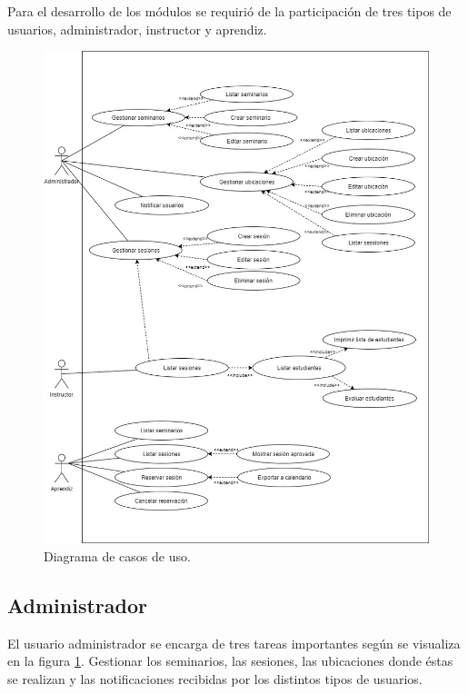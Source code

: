 	Para el desarrollo de los módulos se requirió de la participación de tres tipos de usuarios, administrador, instructor y aprendiz.
	\begin{figure}[h]
		\begin{center}
			\includegraphics[width=\textwidth]{figuras/diagramaCasosDeUso.jpg}
			\caption{Diagrama de casos de uso.} \label{fig:diagramaCasosDeUso}
		\end{center}
	\end{figure}

		\subsection{Administrador} %
		\label{sub:administrador}
		
		El usuario administrador se encarga de tres tareas importantes según se visualiza en la figura \ref{fig:diagramaCasosDeUso}. Gestionar los seminarios, las sesiones, las ubicaciones donde éstas se realizan y las notificaciones recibidas por los distintos tipos de usuarios.

